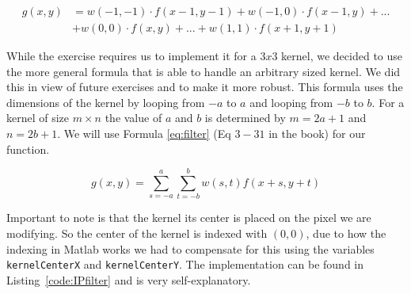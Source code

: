 \documentclass{article}
\begin{document}
\begin{equation}\label{eq:filter3x3}
\begin{split}
    g(x,y) &= w(-1,-1)\cdot f(x-1, y-1) + w(-1,0)\cdot f(x-1,y) + ...\\
            &+ w(0,0)\cdot f(x,y) + ... + w(1,1) \cdot f(x+1,y+1) 
\end{split}
\end{equation}

While the exercise requires us to implement it for a $3x3$ kernel, we decided to use the more general formula that is able to handle an arbitrary sized kernel. We did this in view of future exercises and to make it more robust. This formula uses the dimensions of the kernel by looping from $-a$ to $a$ and looping from $-b$ to $b$. For a kernel of size $m \times n$ the value of $a$ and $b$ is determined by $m = 2a + 1$ and $n = 2b + 1$. We will use Formula \ref{eq:filter} (Eq $3-31$ in the book) for our function.

\begin{equation}\label{eq:filter}
    g(x, y)=\sum_{s=-a}^{a} \sum_{t=-b}^{b} w(s, t) f(x+s, y+t)
\end{equation}

Important to note is that the kernel its center is placed on the pixel we are modifying. So the center of the kernel is indexed with $(0,0)$, due to how the indexing in Matlab works we had to compensate for this using the variables \texttt{kernelCenterX} and \texttt{kernelCenterY}. The implementation can be found in  Listing~\ref{code:IPfilter} and is very self-explanatory.
\end{document}
